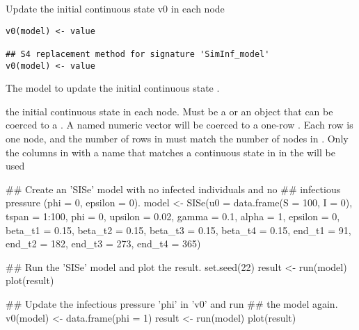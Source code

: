 \documentclass[letterpaper]{book}
\begin{document}
%
\begin{Description}
Update the initial continuous state v0 in each node
\end{Description}
%
\begin{Usage}
\begin{verbatim}
v0(model) <- value

## S4 replacement method for signature 'SimInf_model'
v0(model) <- value
\end{verbatim}
\end{Usage}
%
\begin{Arguments}
\begin{ldescription}
\item[\code{model}] The model to update the initial continuous state
.

\item[\code{value}] the initial continuous state in each node. Must be a
 or an object that can be coerced to a
. A named numeric vector will be coerced to a
one-row . Each row is one node, and the
number of rows in  must match the number of nodes in
. Only the columns in  with a name that
matches a continuous state in  in the 
will be used
\end{ldescription}
\end{Arguments}
%
\begin{Examples}
\begin{ExampleCode}
## Create an 'SISe' model with no infected individuals and no
## infectious pressure (phi = 0, epsilon = 0).
model <- SISe(u0 = data.frame(S = 100, I = 0), tspan = 1:100,
              phi = 0, upsilon = 0.02, gamma = 0.1, alpha = 1,
              epsilon = 0, beta_t1 = 0.15, beta_t2 = 0.15,
              beta_t3 = 0.15, beta_t4 = 0.15, end_t1 = 91,
              end_t2 = 182, end_t3 = 273, end_t4 = 365)

## Run the 'SISe' model and plot the result.
set.seed(22)
result <- run(model)
plot(result)

## Update the infectious pressure 'phi' in 'v0' and run
## the model again.
v0(model) <- data.frame(phi = 1)
result <- run(model)
plot(result)
\end{ExampleCode}
\end{Examples}
\printindex{}
\end{document}
